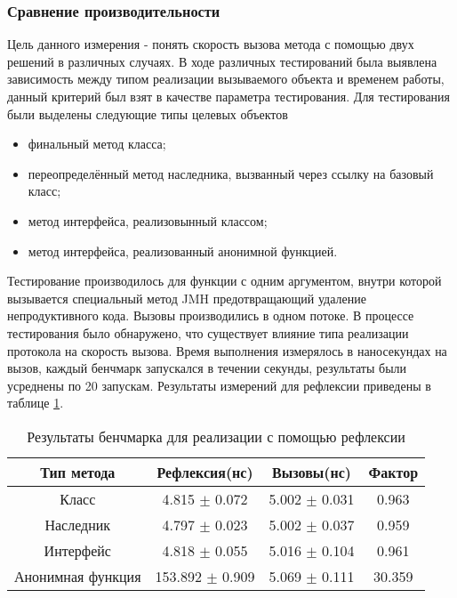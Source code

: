 \subsubsection{Сравнение производительности}
Цель данного измерения - понять скорость вызова метода с помощью двух решений в различных случаях. В ходе различных тестирований была выявлена зависимость между типом реализации вызываемого объекта и временем работы, данный критерий был взят в качестве параметра тестирования. Для тестирования были выделены следующие типы целевых объектов
\begin{itemize}
  \item финальный метод класса;
  \item переопределённый метод наследника, вызванный через ссылку на базовый класс;
  \item метод интерфейса, реализовынный классом;
  \item метод интерфейса, реализованный анонимной функцией.
\end{itemize}

Тестирование производилось для функции с одним аргументом, внутри которой вызывается специальный метод JMH\cite{jmh} предотвращающий удаление непродуктивного кода. Вызовы производились в одном потоке. В процессе тестирования было обнаружено, что существует влияние типа реализации протокола на скорость вызова. Время выполнения измерялось в наносекундах на вызов, каждый бенчмарк запускался в течении секунды, результаты были усреднены по 20 запускам. Результаты измерений для рефлексии приведены в таблице \ref{benchmark:prototype}.
\begin{table}
\begin{center}
\begin{tabular}{|c|c|c|c|} \hline
Тип метода & Рефлексия(нс) &  Вызовы(нс) & Фактор \\ \hline
Класс & 4.815 $\pm$ 0.072 & 5.002 $\pm$ 0.031 & 0.963 \\ \hline
Наследник & 4.797 $\pm$ 0.023 & 5.002 $\pm$ 0.037 & 0.959 \\ \hline
Интерфейс & 4.818 $\pm$ 0.055 & 5.016 $\pm$ 0.104 & 0.961 \\ \hline
Анонимная функция & 153.892 $\pm$ 0.909 & 5.069 $\pm$ 0.111 & 30.359 \\ \hline
\end{tabular}
\caption{Результаты бенчмарка для реализации с помощью рефлексии}
\label{benchmark:prototype}
\end{center}
\end{table}


